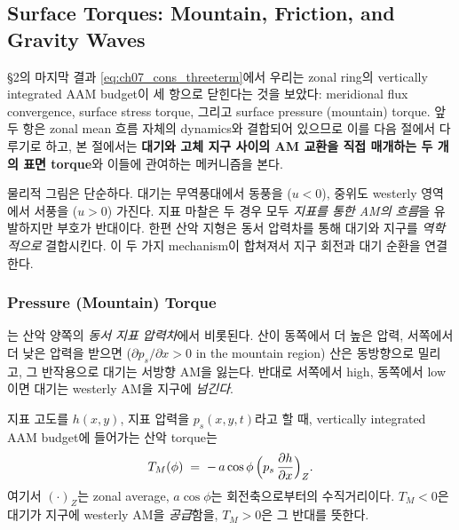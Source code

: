 \subsection{Surface Torques: Mountain, Friction, and Gravity Waves}

\S2의 마지막 결과 \eqref{eq:ch07_cons_threeterm}에서 우리는 zonal ring의
vertically integrated AAM budget이 세 항으로 닫힌다는 것을 보았다:
meridional flux convergence, surface stress torque, 그리고 surface pressure
(mountain) torque.  앞 두 항은 zonal mean 흐름 자체의 dynamics와 결합되어
있으므로 이를 다음 절에서 다루기로 하고, 본 절에서는 \textbf{대기와 고체
지구 사이의 AM 교환을 직접 매개하는 두 개의 표면 torque}와 이들에
관여하는  메커니즘을 본다.

물리적 그림은 단순하다.  대기는 무역풍대에서 동풍을 ($u<0$),
중위도 westerly 영역에서 서풍을 ($u>0$) 가진다.  지표 마찰은 두 경우 모두
\textit{지표를 통한 AM의 흐름}을 유발하지만 부호가 반대이다.  한편 산악
지형은 동서 압력차를 통해 대기와 지구를 \textit{역학적으로} 결합시킨다.
이 두 가지 mechanism이 합쳐져서 지구 회전과 대기 순환을 연결한다.


\subsubsection{Pressure (Mountain) Torque}

는 산악 양쪽의 \textit{동서 지표 압력차}에서 비롯된다.
산이 동쪽에서 더 높은 압력, 서쪽에서 더 낮은 압력을 받으면 ($\partial p_s/\partial x > 0$
in the mountain region) 산은 동방향으로 밀리고, 그 반작용으로 대기는
서방향 AM을 잃는다.  반대로 서쪽에서 high, 동쪽에서 low이면 대기는
westerly AM을 지구에 \textit{넘긴다}.

\begin{definition}\label{def:ch07_torque_mountain}
지표 고도를 $h(x,y)$, 지표 압력을 $p_s(x,y,t)$라고 할 때, vertically integrated
AAM budget에 들어가는 산악 torque는
\begin{equation}\label{eq:ch07_torque_mountain_def}
  T_M(\phi)
   \;=\;
   -\,a\cos\phi\,\Bigl(p_s\,\frac{\partial h}{\partial x}\Bigr)_Z .
\end{equation}
여기서 $(\cdot)_Z$는 zonal average, $a\cos\phi$는 회전축으로부터의
수직거리이다.  $T_M < 0$은 대기가 지구에 westerly AM을 \textit{공급}함을,
$T_M > 0$은 그 반대를 뜻한다.
\end{definition}

